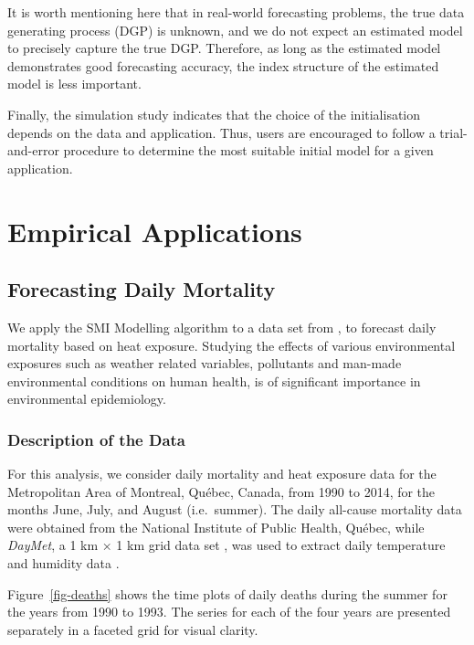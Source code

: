\documentclass[
  11pt,
  a4paper,
]{article}
\begin{document}
It is worth mentioning here that in real-world forecasting problems, the
true data generating process (DGP) is unknown, and we do not expect an
estimated model to precisely capture the true DGP. Therefore, as long as
the estimated model demonstrates good forecasting accuracy, the index
structure of the estimated model is less important.

Finally, the simulation study indicates that the choice of the
initialisation depends on the data and application. Thus, users are
encouraged to follow a trial-and-error procedure to determine the most
suitable initial model for a given application.

\section{Empirical Applications}\label{sec-application}

\subsection{Forecasting Daily Mortality}\label{sec-mortality}

We apply the SMI Modelling algorithm to a data set from
\textcite{Masselot2022}, to forecast daily mortality based on heat
exposure. Studying the effects of various environmental exposures such
as weather related variables, pollutants and man-made environmental
conditions on human health, is of significant importance in
environmental epidemiology.

\subsubsection{Description of the Data}\label{description-of-the-data}

For this analysis, we consider daily mortality and heat exposure data
for the Metropolitan Area of Montreal, Québec, Canada, from 1990 to
2014, for the months June, July, and August (i.e.~summer). The daily
all-cause mortality data were obtained from the National Institute of
Public Health, Québec, while \emph{DayMet}, a 1 km × 1 km grid data set
\autocite{Thornton2021}, was used to extract daily temperature and
humidity data \autocite{Masselot2022}.

Figure~\ref{fig-deaths} shows the time plots of daily deaths during the
summer for the years from 1990 to 1993. The series for each of the four
years are presented separately in a faceted grid for visual clarity.
\end{document}
